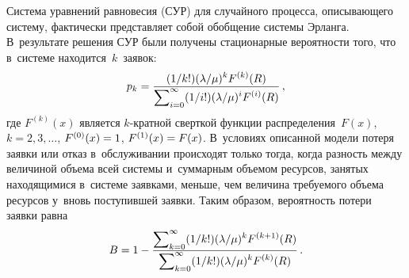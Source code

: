 \begin{multicols}{2}
Система уравнений равновесия (СУР) для случайного процесса, описывающего 
систему, фактически представляет собой обобщение системы Эрланга. В~результате 
решения СУР были получены стационарные вероятности того, что в~сис\-те\-ме 
находится~$k$~заявок:
\begin{equation*}
p_k=\displaystyle\frac{\displaystyle ({1}/{k!})({\lambda}/{\mu})^kF^{(k)}(R)\mathstrut}{\displaystyle \sum\nolimits_{i=0}^{\infty}
({1}/{i!})({\lambda}/{\mu})^iF^{(i)}(R)\mathstrut}\,,
\end{equation*}
где $F^{(k)}(x)$ является $k$-крат\-ной сверткой функции распределения~$F(x)$, 
$k=2,3,\ldots$,
$F^{(0)}(x)\hm=1$, $F^{(1)}(x)\hm=F(x)$.
В~условиях описанной модели потеря заявки или отказ в~обслуживании происходят 
только тогда, когда раз\-ность между величиной объема всей сис\-те\-мы и~суммарным 
объемом ресурсов, занятых находящимися в~сис\-те\-ме заявками, меньше, чем величина 
требуемого объема ресурсов у~вновь поступившей заявки. Таким образом, 
вероятность потери заявки равна
\begin{equation*}
B=1-
\displaystyle\frac{\displaystyle \sum\nolimits_{k=0}^{\infty}({1}/{k!})({\lambda}/{\mu})^kF^{(k+1)}(R)\mathstrut}{\displaystyle \sum\nolimits_{k=0}^{\infty}({1}/{k!})({\lambda}/{\mu})^kF^{(k)}(R)\mathstrut}\,.
\end{equation*}


\end{multicols}

